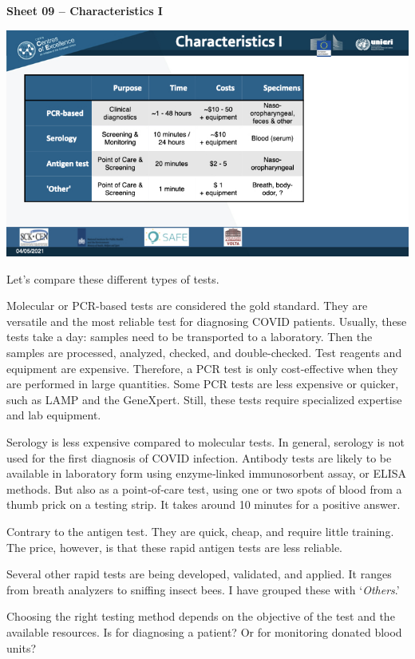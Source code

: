\documentclass[
]{book}
\begin{document}
\textbf{Sheet 09 -- Characteristics I}

\includegraphics{images/m02/m02_types_of_rapid_tests_final.009.jpeg}

Let's compare these different types of tests.

Molecular or PCR-based tests are considered the gold standard. They are
versatile and the most reliable test for diagnosing COVID patients.
Usually, these tests take a day: samples need to be transported to a
laboratory. Then the samples are processed, analyzed, checked, and
double-checked. Test reagents and equipment are expensive. Therefore, a
PCR test is only cost-effective when they are performed in large
quantities. Some PCR tests are less expensive or quicker, such as LAMP
and the GeneXpert. Still, these tests require specialized expertise and
lab equipment.

Serology is less expensive compared to molecular tests. In general,
serology is not used for the first diagnosis of COVID infection.
Antibody tests are likely to be available in laboratory form using
enzyme‐linked immunosorbent assay, or ELISA methods. But also as a
point‐of‐care test, using one or two spots of blood from a thumb prick
on a testing strip. It takes around 10 minutes for a positive answer.

Contrary to the antigen test. They are quick, cheap, and require little
training. The price, however, is that these rapid antigen tests are less
reliable.

Several other rapid tests are being developed, validated, and applied.
It ranges from breath analyzers to sniffing insect bees. I have grouped
these with `\emph{Others}.'

Choosing the right testing method depends on the objective of the test
and the available resources. Is for diagnosing a patient? Or for
monitoring donated blood units?
\end{document}
